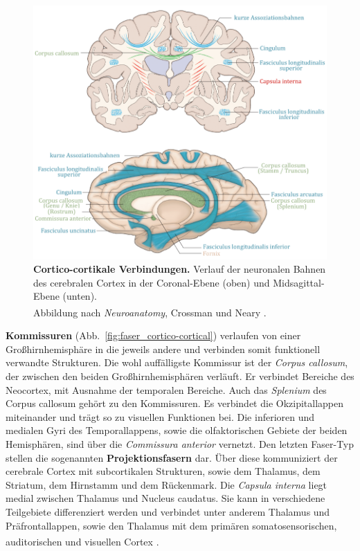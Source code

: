 \begin{figure}[H]
    \centering
    \includegraphics[width=\textwidth]{pictures/Bilder_Jule/Andere/cortico-cortical_(crossm13).png}
    \caption[Cortico-cortikale Verbindungen]{\textbf{Cortico-cortikale Verbindungen.} Verlauf der neuronalen Bahnen des cerebralen Cortex in der Coronal-Ebene (oben) und Midsagittal-Ebene (unten).\\
    Abbildung nach \textit{Neuroanatomy}, Crossman und Neary \textsuperscript{\cite[Kap.~13]{crossman2014neuroanatomy}}.}
    \label{fig:cortico-cortical}
\end{figure}{}

\noindent \textbf{Kommissuren} (Abb.~\ref{fig:faser_cortico-cortical}) verlaufen von einer Großhirnhemisphäre in die jeweils andere und verbinden somit funktionell verwandte Strukturen. Die wohl auffälligste Kommissur ist der \textit{Corpus callosum}, der zwischen den beiden Großhirnhemisphären verläuft. Er verbindet Bereiche des Neocortex, mit Ausnahme der temporalen Bereiche. Auch das \textit{Splenium} des Corpus callosum gehört zu den Kommissuren. Es verbindet die Okzipitallappen miteinander und trägt so zu visuellen Funktionen bei. Die inferioren und medialen Gyri des Temporallappens, sowie die olfaktorischen Gebiete der beiden Hemisphären, sind über die \textit{Commissura anterior} vernetzt. Den letzten Faser-Typ stellen die sogenannten \textbf{Projektionsfasern} dar. Über diese kommuniziert der cerebrale Cortex mit subcortikalen Strukturen, sowie dem Thalamus, dem Striatum, dem Hirnstamm und dem Rückenmark. Die \textit{Capsula interna} liegt  medial zwischen Thalamus und Nucleus caudatus. Sie kann in verschiedene Teilgebiete differenziert werden und verbindet unter anderem Thalamus und Präfrontallappen, sowie den Thalamus mit dem primären somatosensorischen, auditorischen und visuellen Cortex \textsuperscript{\cite[Kap.~13]{crossman2014neuroanatomy}}.

